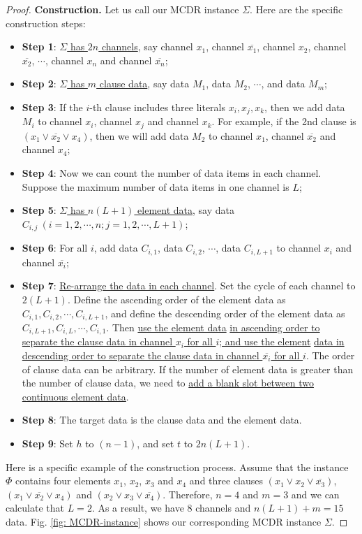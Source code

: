 \documentclass[12pt,a4paper]{article}
\theoremstyle{definition}
\begin{document}
\begin{enumerate}
\begin{proof}
    \textbf{Construction.} Let us call our MCDR instance $\Sigma$. Here are the specific construction steps:
    \begin{itemize}
    \item \textbf{Step 1}: \underline{$\Sigma$ has $2n$ channels}, say channel $x_1$, channel $\overline{x_1}$, channel $x_2$, channel $\overline{x_2}$, $\cdots$, channel $x_n$ and channel $\overline{x_n}$;
    \item \textbf{Step 2}: \underline{$\Sigma$ has $m$ clause data}, say data $M_1$, data $M_2$, $\cdots$, and data $M_m$;
    \item \textbf{Step 3}: If the $i$-th clause includes three literals $x_i, x_j, x_k$, then we add data $M_i$ to channel $x_i$, channel $x_j$ and channel $x_k$. For example, if the 2nd clause is $(x_1 \lor \overline{x_2} \lor x_4)$, then we will add data $M_2$ to channel $x_1$, channel $\overline{x_2}$ and channel $x_4$;
    \item \textbf{Step 4}: Now we can count the number of data items in each channel. Suppose the maximum number of data items in one channel is $L$;
    \item \textbf{Step 5}: \underline{$\Sigma$ has $n(L+1)$ element data}, say data $C_{i,j}\ (i = 1,2,\cdots,n; j=1,2,\cdots,L + 1)$;
    \item \textbf{Step 6}: For all $i$, add data $C_{i,1}$, data $C_{i,2}$, $\cdots$, data $C_{i, L+1}$ to channel $x_i$ and channel $\overline{x_i}$;
    \item \textbf{Step 7}: \underline{Re-arrange the data in each channel}. Set the cycle of each channel to $2(L+1)$. Define the ascending order of the element data as $C_{i,1}, C_{i,2}, \cdots, C_{i, L+1}$, and define the descending order of the element data as $C_{i,L+1}, C_{i,L}, \cdots, C_{i, 1}$. Then \underline{use the element data} \underline{in ascending order to separate the clause data in channel $x_i$ for all $i$; and use the element} \underline{data in descending order to separate the clause data in channel $\overline{x_i}$ for all $i$}. The order of clause data can be arbitrary. If the number of element data is greater than the number of clause data, we need to \underline{add a blank slot between two continuous element data}.
    \item \textbf{Step 8}: The target data is the clause data and the element data.
    \item \textbf{Step 9}: Set $h$ to $(n-1)$, and set $t$ to $2n(L+1)$. 
    \end{itemize}
    \clearpage
    Here is a specific example of the construction process. Assume that the instance $\Phi$ contains four elements $x_1$, $x_2$, $x_3$ and $x_4$ and three clauses $(x_1 \lor x_2 \lor \overline{x_3})$, $(x_1 \lor \overline{x_2} \lor x_4)$ and $(x_2 \lor x_3 \lor \overline{x_4})$. Therefore, $n = 4$ and $m = 3$ and we can calculate that $L = 2$. As a result, we have $8$ channels and $n(L+1) + m = 15$ data. Fig. \ref{fig: MCDR-instance} shows our corresponding MCDR instance $\Sigma$.
    

\end{proof}
\end{enumerate}
\end{document}
